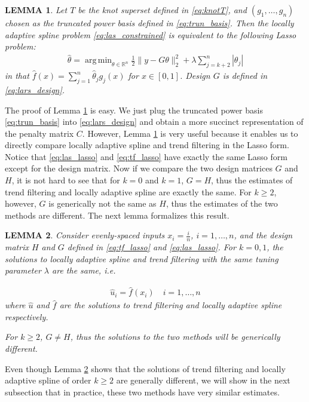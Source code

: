 \documentclass[a4paper]{article}
\DeclareMathOperator*{\argmin}{arg\,min}
\newtheorem{lemma}{LEMMA}
\newcommand{\RR}{\mathbb{R}}
\begin{document}
\begin{lemma}
Let $T$ be the knot superset defined in \eqref{eq:knotT}, and $(g_1,\ldots, g_n)$ chosen as the truncated power basis defined in \eqref{eq:trun_basis}. Then the locally adaptive spline problem \eqref{eq:las_constrained} is equivalent to the following Lasso problem:
\begin{align}
\hat{\theta} = \argmin_{\theta\in\RR^n}\frac{1}{2}\|y-G\theta\|_2^2 + \lambda\sum_{j=k+2}^n |\theta_j|
\label{eq:las_lasso}
\end{align}
in that $\hat{f}(x) = \sum_{j=1}^n \hat{\theta}_jg_j(x)$ for $x\in[0, 1]$. Design $G$ is defined in \eqref{eq:lars_design}.
\label{lemma:las_lasso}
\end{lemma}

The proof of Lemma \ref{lemma:las_lasso} is easy. We just plug the truncated power basis \eqref{eq:trun_basis} into \eqref{eq:lars_design} and obtain a more succinct representation of the penalty matrix $C$. However, Lemma \ref{lemma:las_lasso} is very useful because it enables us to directly compare locally adaptive spline and trend filtering in the Lasso form. Notice that \eqref{eq:las_lasso} and \eqref{eq:tf_lasso} have exactly the same Lasso form except for the design matrix. Now if we compare the two design matrices $G$ and $H$, it is not hard to see that for $k = 0$ and $k = 1$, $G = H$, thus the estimates of trend filtering and locally adaptive spline are exactly the same. For $k\geq 2$, however, $G$ is generically not the same as $H$, thus the estimates of the two methods are different. The next lemma formalizes this result. 

\begin{lemma}
Consider evenly-spaced inputs $x_i = \frac{i}{n}$, $i= 1,\ldots, n$, and the design matrix $H$ and $G$ defined in \eqref{eq:tf_lasso} and \eqref{eq:las_lasso}. For $k = 0, 1$, the solutions to locally adaptive spline and trend filtering with the same tuning parameter $\lambda$ are the same, i.e.

\begin{align*}
\hat{u}_i = \hat{f}(x_i) \quad i=1,\ldots, n
\end{align*}
where $\hat{u}$ and $\hat{f}$ are the solutions to trend filtering and locally adaptive spline respectively.

For $k\geq 2$, $G\neq H$, thus the solutions to the two methods will be generically different. 
\label{lemma:lasequivtf}
\end{lemma}

Even though Lemma \ref{lemma:lasequivtf} shows that the solutions of trend filtering and locally adaptive spline of order $k\geq 2$ are generally different, we will show in the next subsection that in practice, these two methods have very similar estimates. 
\end{document}
